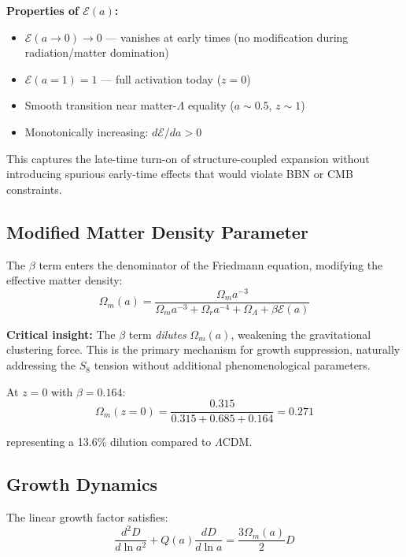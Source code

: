 \documentclass[twocolumn,superscriptaddress,prl,amsmath,amssymb]{revtex4-2}
\begin{document}
\textbf{Properties of $\mathcal{E}(a)$:}
\begin{itemize}
\item $\mathcal{E}(a \to 0) \to 0$ — vanishes at early times (no modification during radiation/matter domination)
\item $\mathcal{E}(a = 1) = 1$ — full activation today ($z=0$)
\item Smooth transition near matter-$\Lambda$ equality ($a \sim 0.5$, $z \sim 1$)
\item Monotonically increasing: $d\mathcal{E}/da > 0$
\end{itemize}

This captures the late-time turn-on of structure-coupled expansion without introducing spurious early-time effects that would violate BBN or CMB constraints.

\subsection{Modified Matter Density Parameter}

The $\beta$ term enters the denominator of the Friedmann equation, modifying the effective matter density:
\begin{equation}
\Omega_m(a) = \frac{\Omega_m a^{-3}}{\Omega_m a^{-3} + \Omega_r a^{-4} + \Omega_\Lambda + \beta \mathcal{E}(a)}
\label{eq:Omega_m_modified}
\end{equation}

\textbf{Critical insight:} The $\beta$ term \textit{dilutes} $\Omega_m(a)$, weakening the gravitational clustering force. This is the primary mechanism for growth suppression, naturally addressing the $S_8$ tension without additional phenomenological parameters.

At $z=0$ with $\beta = 0.164$:
\begin{equation}
\Omega_m(z=0) = \frac{0.315}{0.315 + 0.685 + 0.164} = 0.271
\end{equation}

representing a 13.6\% dilution compared to $\Lambda$CDM.

\subsection{Growth Dynamics}

The linear growth factor satisfies:
\begin{equation}
\frac{d^2D}{d\ln a^2} + Q(a) \frac{dD}{d\ln a} = \frac{3\Omega_m(a)}{2}D
\label{eq:growth}
\end{equation}
\end{document}
